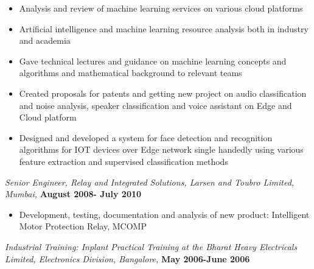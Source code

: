 \documentclass[line]{resume}
\begin{document}
{\begin{resume}
\begin{list2}
			\begin{itemize}
				\item Analysis and review of machine learning services on various cloud platforms \vspace{-.1cm}
				\item  Artificial intelligence and machine learning resource analysis both in industry and academia
				\item Gave technical lectures and guidance on machine learning  concepts and algorithms and  mathematical background to  relevant teams
				\item  Created proposals for patents and getting new project on audio classification and noise analysis, speaker classification and voice assistant on Edge and Cloud platform %
				\item Designed and developed a  system for face detection and recognition
				algorithms for IOT devices over Edge network single handedly using various feature extraction and supervised classification methods
				
			\end{itemize}
			
			\item \emph{Senior Engineer, Relay and Integrated
				Solutions, Larsen and Toubro Limited, Mumbai,} \hfill
			\textbf{August 2008- July 2010} 
			\begin{itemize}
				\item
				Development, testing, documentation and analysis of new product: Intelligent Motor Protection Relay, MCOMP 

				
			\end{itemize}
			
			
			
			
			\item
			\emph{Industrial Training:
				Inplant Practical Training at the Bharat Heavy
				Electricals Limited, Electronics Division, Bangalore,}
		\hfill	\textbf{May 2006-June 2006}
		\end{list2}
	
	

\end{resume}}
\end{document}
